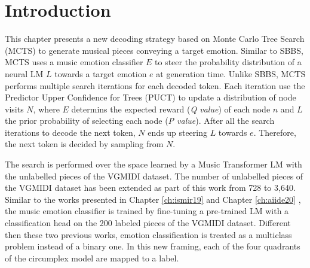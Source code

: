 \section{Introduction}


This chapter presents a new decoding strategy based on Monte Carlo Tree Search (MCTS) to generate musical pieces conveying a target emotion. Similar to SBBS, MCTS uses a music emotion classifier $E$ to steer the probability distribution of a neural LM $L$ towards a target emotion $e$ at generation time. Unlike SBBS, MCTS performs multiple search iterations for each decoded token. Each iteration use the Predictor Upper Confidence for Trees (PUCT) to update a distribution of node visits $N$, where $E$ determins the expected reward (\textit{Q value}) of each node $n$ and $L$ the prior probability of selecting each node (\textit{P value}). After all the search iterations to decode the next token, $N$ ends up steering $L$ towards $e$. Therefore, the next token is decided by sampling from $N$.

The search is performed over the space learned by a Music Transformer LM \cite {huang2018music} with the unlabelled pieces of the VGMIDI dataset. The number of unlabelled pieces of the VGMIDI dataset has been extended as part of this work from 728 to 3,640. Similar to the works presented in Chapter \ref{ch:ismir19} \cite{ferreira_2019} and Chapter \ref{ch:aiide20} \cite{ferreira2020computer}, the music emotion classifier is trained by fine-tuning a pre-trained LM with a classification head on the 200 labeled pieces of the VGMIDI dataset. Different then these two previous works, emotion classification is treated as a multiclass problem instead of a binary one. In this new framing, each of the four quadrants of the circumplex model are mapped to a label.

